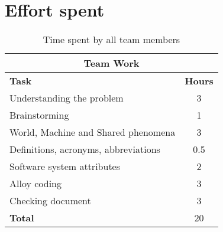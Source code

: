 \documentclass[../RASD.tex]{subfiles}
\begin{document}
    \chapter{Effort spent}\label{ch:effort-spent}
    \begin{table}[h]
        \centering
        \begin{tabular}{l c}
            \hline\hline
            \multicolumn{2}{c}{\textbf{Team Work}} \\
            \hline
            \textbf{Task} & \textbf{Hours} \\ [0.5ex]
            \hline
            Understanding the problem & 3  \\
            Brainstorming & 1 \\
            World, Machine and Shared phenomena & 3 \\
            Definitions, acronyms, abbreviations & 0.5  \\
            Software system attributes & 2 \\
            Alloy coding & 3 \\
            Checking document & 3  \\
            \hline
            \textbf{Total} & 20  \\
            \hline
        \end{tabular}
        \caption{Time spent by all team members}
        \label{fig:Time spent by all team members}
    \end{table}
\end{document}
